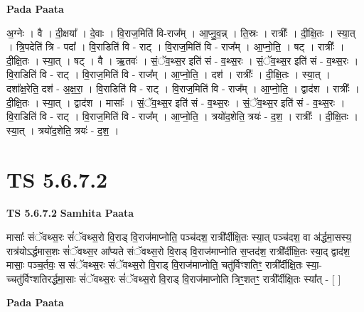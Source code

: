 \documentclass[17pt]{extarticle}
\begin{document}
\textbf{Pada Paata} \newline

अ॒ग्नेः । वै । दी॒क्षया᳚ । दे॒वाः । वि॒राज॒मिति॑ वि-राज᳚म् । आ॒प्नु॒व॒न्न् । ति॒स्रः । रात्रीः᳚ । दी॒क्षि॒तः । स्या॒त् । त्रि॒पदेति॑ त्रि - पदा᳚ । वि॒राडिति॑ वि - राट् । वि॒राज॒मिति॑ वि - राज᳚म् । आ॒प्नो॒ति॒ । षट् । रात्रीः᳚ । दी॒क्षि॒तः । स्या॒त् । षट् । वै । ऋ॒तवः॑ । सं॒ॅव॒थ्स॒र इति॑ सं - व॒थ्स॒रः । सं॒ॅव॒थ्स॒र इति॑ सं - व॒थ्स॒रः । वि॒राडिति॑ वि - राट् । वि॒राज॒मिति॑ वि - राज᳚म् । आ॒प्नो॒ति॒ । दश॑ । रात्रीः᳚ । दी॒क्षि॒तः । स्या॒त् । दशा᳚क्ष॒रेति॒ दश॑ - अ॒क्ष॒रा॒ । वि॒राडिति॑ वि - राट् । वि॒राज॒मिति॑ वि - राज᳚म् । आ॒प्नो॒ति॒ । द्वाद॑श । रात्रीः᳚ । दी॒क्षि॒तः । स्या॒त् । द्वाद॑श । मासाः᳚ । सं॒ॅव॒थ्स॒र इति॑ सं - व॒थ्स॒रः । सं॒ॅव॒थ्स॒र इति॑ सं - व॒थ्स॒रः । वि॒राडिति॑ वि - राट् । वि॒राज॒मिति॑ वि - राज᳚म् । आ॒प्नो॒ति॒ । त्रयो॑द॒शेति॒ त्रयः॑ - द॒श॒ । रात्रीः᳚ । दी॒क्षि॒तः । स्या॒त् । त्रयो॑द॒शेति॒ त्रयः॑ - द॒श॒ ।  \newline




\section*{ TS 5.6.7.2 }

\textbf{TS 5.6.7.2 } \newline
\textbf{Samhita Paata} \newline

मासाः᳚ संॅवथ्स॒रः सं॑ॅवथ्स॒रो वि॒राड् वि॒राज॑माप्नोति॒ पञ्च॑दश॒ रात्री᳚र्दीक्षि॒तः स्या॒त् पञ्च॑दश॒ वा अ॑र्द्धमा॒सस्य॒ रात्र॑योऽर्द्धमास॒शः सं॑ॅवथ्स॒र आ᳚प्यते संॅवथ्स॒रो वि॒राड् वि॒राज॑माप्नोति स॒प्तद॑श॒ रात्री᳚र्दीक्षि॒तः स्या॒द् द्वाद॑श॒ मासाः॒ पञ्च॒र्तवः॒ स सं॑ॅवथ्स॒रः सं॑ॅवथ्स॒रो वि॒राड् वि॒राज॑माप्नोति॒ चतु॑र्विꣳशतिꣳ॒॒ रात्री᳚र्दीक्षि॒तः स्या॒-च्चतु॑र्विꣳशतिरर्द्धमा॒साः सं॑ॅवथ्स॒रः सं॑ॅवथ्स॒रो वि॒राड् वि॒राज॑माप्नोति त्रिꣳ॒॒शतꣳ॒॒ रात्री᳚र्दीक्षि॒तः स्या᳚त् - [  ] \newline

\textbf{Pada Paata} \newline
\end{document}
